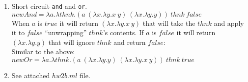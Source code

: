 \documentclass{article}
\begin{document}
\begin{enumerate}
\begin{proof}
\begin{enumerate}
      \end{enumerate}
    \end{proof}

  \item Short circuit \verb|and| and \verb|or|.\\

    $newAnd = \lambda a.\lambda thnk.(a\ (\lambda x.\lambda y.x\ y)\ (\lambda x.\lambda y.y))\ thnk\ false$\\

    When $a$ is $true$ it will return $(\lambda x.\lambda y.x\ y)$ that will take the $thnk$ and apply it to $false$ ``unwrapping'' $thnk$'s contents. If $a$ is $false$ it will return $(\lambda x.\lambda y.y)$ that will ignore $thnk$ and return $false$: \\

    Similar to the above: \\

    $newOr = \lambda a.\lambda thnk.(a\ (\lambda x.\lambda y.y)\ (\lambda x.\lambda y.x\ y))\ thnk\ true$\\

  \item{See attached $hw2b.ml$ file.}
\end{enumerate}
\end{document}
